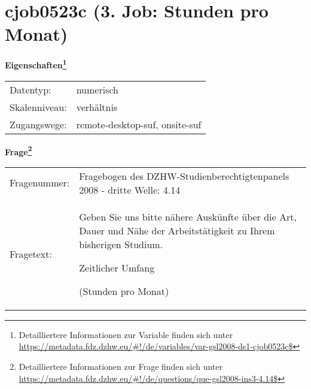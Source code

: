 
    \setcounter{footnote}{0}

    \vspace*{-1.8cm}
	\section{cjob0523c (3. Job: Stunden pro Monat)}
	\label{section:cjob0523c}



    \vspace*{0.5cm}
    \noindent\textbf{Eigenschaften\footnote{Detailliertere Informationen zur Variable finden sich unter
		\url{https://metadata.fdz.dzhw.eu/\#!/de/variables/var-gsl2008-ds1-cjob0523c$}}}\\
	\begin{tabularx}{\hsize}{@{}lX}
	Datentyp: & numerisch \\
	Skalenniveau: & verhältnis \\
	Zugangswege: &
	  remote-desktop-suf, 
	  onsite-suf
 \\
    \end{tabularx}



				\vspace*{0.5cm}
                \noindent\textbf{Frage\footnote{Detailliertere Informationen zur Frage finden sich unter
		              \url{https://metadata.fdz.dzhw.eu/\#!/de/questions/que-gsl2008-ins3-4.14$}}}\\
				\begin{tabularx}{\hsize}{@{}lX}
					Fragenummer: &
					  Fragebogen des DZHW-Studienberechtigtenpanels 2008 - dritte Welle:
					  4.14
 \\
					Fragetext: & Geben Sie uns bitte nähere Auskünfte über die Art, Dauer und Nähe der Arbeitstätigkeit zu Ihrem bisherigen Studium.\par  Zeitlicher Umfang\par  (Stunden pro Monat) \\
				\end{tabularx}





